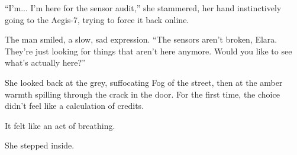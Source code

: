 ``I'm... I'm here for the sensor audit,'' she stammered, her hand instinctively going to the Aegis-7, trying to force it back online. 

The man smiled, a slow, sad expression. ``The sensors aren't broken, Elara. They're just looking for things that aren't here anymore. Would you like to see what's actually here?''

She looked back at the grey, suffocating Fog of the street, then at the amber warmth spilling through the crack in the door. For the first time, the choice didn't feel like a calculation of credits. 

It felt like an act of breathing. 

She stepped inside.
